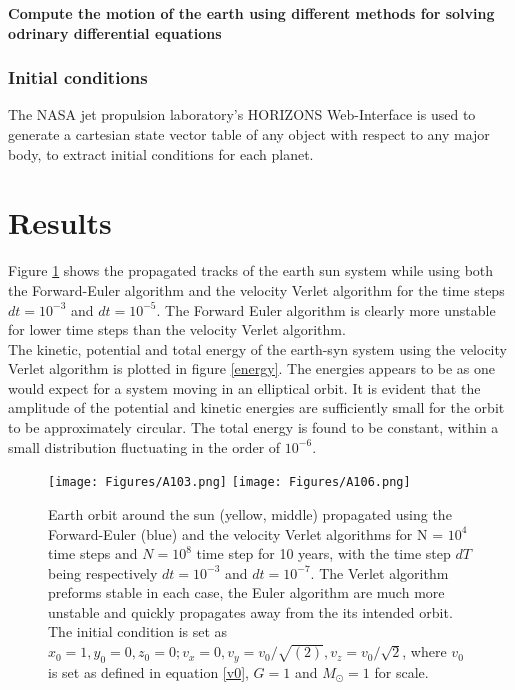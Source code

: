 \documentclass[%
reprint,nofootinbib,
amsmath,amssymb,
aps,
]{revtex4-1}
\begin{document}
 
\textbf{Compute the motion of the earth using different methods for solving odrinary differential equations} \\ 
\subsubsection{Initial conditions} \noindent 
The NASA jet propulsion laboratory's HORIZONS Web-Interface is used to generate a cartesian state vector table of any object with respect to any major body, to extract initial conditions for each planet. 
\section{Results} \noindent 
Figure \ref{earthsun} shows the propagated tracks of the earth sun system while using both the Forward-Euler algorithm and the velocity Verlet algorithm for the time steps $dt = 10^{-3}$ and $dt = 10^{-5}$. The Forward Euler algorithm is clearly more unstable for lower time steps than the velocity Verlet algorithm. \\ \indent 
The kinetic, potential and total energy of the earth-syn system using the velocity Verlet algorithm is plotted in figure \ref{energy}. The energies appears to be as one would expect for a system moving in an elliptical orbit. It is evident that the amplitude of the potential and kinetic energies are sufficiently small for the orbit to be approximately circular. The total energy is found to be constant, within a small distribution fluctuating in the order of $10^{-6}$.   
\onecolumngrid

\begin{figure}
		\texttt{[image: Figures/A103.png]} \hspace{15mm}
	\texttt{[image: Figures/A106.png]}
	\caption{Earth orbit around the sun (yellow, middle) propagated using the Forward-Euler (blue) and the velocity Verlet algorithms for N = $10^4$ time steps and $N = 10^8$ time step for 10 years,  with the time step $dT$ being respectively $dt = 10^{-3}$ and $dt = 10^{-7}$. The Verlet algorithm preforms stable in each case, the Euler algorithm are much more unstable and quickly propagates away from the its intended orbit. The initial condition is set as $x_0 = 1, y_0 = 0, z_0 = 0; v_x = 0, v_y = v_0/\sqrt{(2)}, v_z = v_0/\sqrt{2}$, where $v_0$ is set as defined in equation \ref{v0}, $G = 1$ and $M_\odot = 1$ for scale. \label{earthsun}}
\end{figure}
\end{document}
